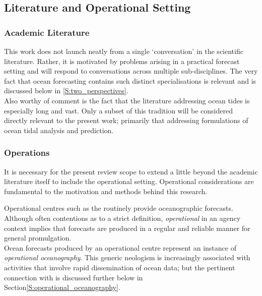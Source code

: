 \subsection{Literature and Operational Setting}

\subsubsection{Academic Literature}
This work does not launch neatly from a single `conversation' \citep{Booth:2009vy} in the scientific literature.  Rather, it is motivated by problems arising in a practical forecast setting and will respond to conversations across multiple sub-disciplines.  The very fact that ocean forecasting contains such distinct specialisations is relevant and is discussed below in \ref{S:two_perspectives}.\\
Also worthy of comment is the fact that the literature addressing ocean tides is especially long and vast.  Only a subset of this tradition will be considered directly relevant to the present work; primarily that addressing formulations of ocean tidal analysis and prediction.  



\subsubsection{Operations}
\label{S:operational_setting}
It is necessary for the present review scope to extend a little beyond the academic literature itself to include the operational setting. Operational considerations are fundamental to the motivation and methods behind this research.



Operational centres such as the \BOM{} routinely provide oceanographic forecasts.  Although often contentions as to a strict definition, \emph{operational} in an agency context implies that forecasts are produced in a regular and reliable manner for general promulgation.\\
Ocean forecasts produced by an operational centre represent an instance of \emph{operational oceanography}.  This generic neologism is increasingly associated with activities that involve rapid dissemination of ocean data; but the pertinent connection with \GODAE{} is discussed further below in Section\ref{S:operational_oceanography}.\\



